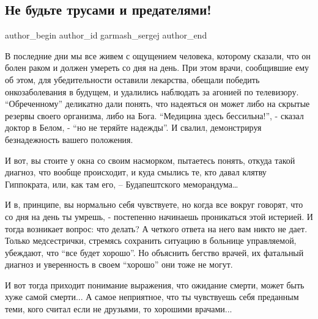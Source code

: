  
 
 
 
 
 
\subsection{Не будьте трусами и предателями!}
\label{sec:14_02_2022.fb.garmash_sergej.1.ne_budjte_trusami_i_predateljami}
 
\ifcmt
 author_begin
   author_id garmash_sergej
 author_end
\fi

В последние дни мы все живем с ощущением человека, которому сказали, что он
болен раком и должен умереть со дня на день. При этом врачи, сообщившие ему об
этом, для убедительности оставили  лекарства, обещали победить онкозаболевания
в будущем, и удалились наблюдать за агонией по телевизору. \enquote{Обреченному}
деликатно дали понять, что надеяться он может либо на скрытые резервы своего
организма, либо на Бога. \enquote{Медицина здесь бессильна!}, - сказал доктор в Белом,
- \enquote{но не теряйте надежды}.   И свалил, демонстрируя безнадежность вашего
положения.

И вот, вы стоите у окна со своим насморком, пытаетесь понять, откуда такой
диагноз, что вообще происходит, и  куда смылись те, кто давал клятву
Гиппократа, или, как там его, – Будапештского меморандума…

И  в, принципе, вы нормально себя чувствуете, но когда все вокруг говорят, что
со дня на день ты умрешь, - постепенно начинаешь проникаться этой истерией. И
тогда возникает вопрос: что делать? А четкого ответа на него вам никто не дает.
Только медсестрички, стремясь сохранить ситуацию в больнице управляемой,
убеждают, что \enquote{все будет хорошо}. Но объяснить бегство врачей, их фатальный
диагноз и уверенность в своем \enquote{хорошо} они тоже не могут.

И вот тогда приходит понимание выражения, что ожидание смерти,  может быть хуже
самой смерти... А самое неприятное, что  ты чувствуешь себя преданным теми, кого
считал если не друзьями, то  хорошими врачами...

